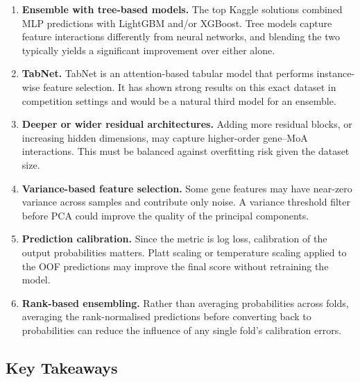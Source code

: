 \documentclass[12pt, a4paper]{article}
\begin{document}
\begin{enumerate}
    \item \textbf{Ensemble with tree-based models.} The top Kaggle solutions combined MLP predictions with LightGBM and/or XGBoost. Tree models capture feature interactions differently from neural networks, and blending the two typically yields a significant improvement over either alone.

    \item \textbf{TabNet.} TabNet \cite{arik2021tabnet} is an attention-based tabular model that performs instance-wise feature selection. It has shown strong results on this exact dataset in competition settings and would be a natural third model for an ensemble.

    \item \textbf{Deeper or wider residual architectures.} Adding more residual blocks, or increasing hidden dimensions, may capture higher-order gene--MoA interactions. This must be balanced against overfitting risk given the dataset size.

    \item \textbf{Variance-based feature selection.} Some gene features may have near-zero variance across samples and contribute only noise. A variance threshold filter before PCA could improve the quality of the principal components.

    \item \textbf{Prediction calibration.} Since the metric is log loss, calibration of the output probabilities matters. Platt scaling or temperature scaling applied to the OOF predictions may improve the final score without retraining the model.

    \item \textbf{Rank-based ensembling.} Rather than averaging probabilities across folds, averaging the rank-normalised predictions before converting back to probabilities can reduce the influence of any single fold's calibration errors.
\end{enumerate}

\subsection{Key Takeaways}
\end{document}
